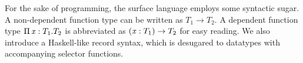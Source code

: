 
For the sake of programming, the surface language employs some
syntactic sugar. A non-dependent function type can be written as
$T_{{\mathrm{1}}}  \rightarrow  T_{{\mathrm{2}}}$. A dependent function type $\Pi \, \mathit{x}  :  T_{{\mathrm{1}}}  .  T_{{\mathrm{2}}}$ is
abbreviated as $(  \mathit{x}  :  T_{{\mathrm{1}}}  )  \rightarrow  T_{{\mathrm{2}}}$ for easy reading. We also
introduce a Haskell-like record syntax, which is desugared to
datatypes with accompanying selector functions.


